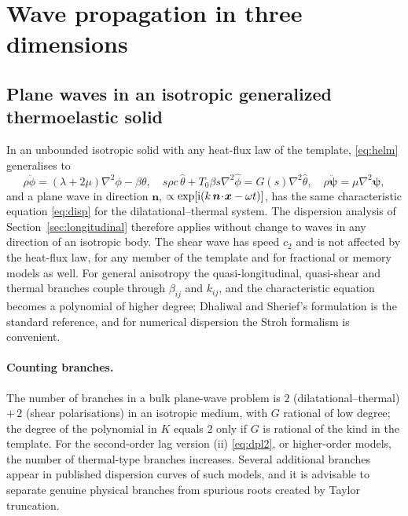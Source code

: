 \section{Wave propagation in three dimensions}\label{sec:waves3d}
\subsection{Plane waves in an isotropic generalized thermoelastic solid}
In an unbounded isotropic solid with any heat-flux law of the template, \eqref{eq:helm} generalises to
\begin{equation}
\rho\ddot\phi=(\lambda+2\mu)\nabla^2\phi-\beta\theta,\quad
s\rho c\,\hat\theta+T_0\beta s\nabla^2\hat\phi=G(s)\nabla^2\hat\theta,\quad
\rho\ddot{\bm\psi}=\mu\nabla^2\bm\psi,
\end{equation}
and a plane wave in direction $\bm n$, $\propto\exp[\mathrm i(k\,\bm n\!\cdot\!\bm x-\omega t)]$, has the same characteristic equation \eqref{eq:disp} for the dilatational--thermal system. The dispersion analysis of Section~\ref{sec:longitudinal} therefore applies without change to waves in any direction of an isotropic body. The shear wave has speed $c_2$ and is not affected by the heat-flux law, for any member of the template and for fractional or memory models as well. For general anisotropy the quasi-longitudinal, quasi-shear and thermal branches couple through $\beta_{ij}$ and $k_{ij}$, and the characteristic equation becomes a polynomial of higher degree; Dhaliwal and Sherief's formulation \citep{Dhaliwal1980} is the standard reference, and for numerical dispersion the Stroh formalism \citep{Stroh1958,Stroh1962} is convenient.

\paragraph{Counting branches.} The number of branches in a bulk plane-wave problem is $2$ (dilatational--thermal) $+\,2$ (shear polarisations) in an isotropic medium, with $G$ rational of low degree; the degree of the polynomial in $K$ equals $2$ only if $G$ is rational of the kind in the template. For the second-order lag version (ii) \eqref{eq:dpl2}, or higher-order models, the number of thermal-type branches increases. Several additional branches appear in published dispersion curves of such models, and it is advisable to separate genuine physical branches from spurious roots created by Taylor truncation.

